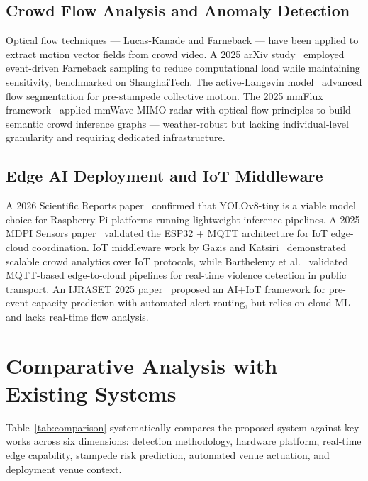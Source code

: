 \documentclass[12pt,a4paper]{article}
\begin{document}
\subsection{Crowd Flow Analysis and Anomaly Detection}

Optical flow techniques — Lucas-Kanade and Farneback — have been applied to extract motion vector fields from crowd video. A 2025 arXiv study~\cite{farneback_2025} employed event-driven Farneback sampling to reduce computational load while maintaining sensitivity, benchmarked on ShanghaiTech. The active-Langevin model~\cite{langevin} advanced flow segmentation for pre-stampede collective motion. The 2025 mmFlux framework~\cite{mmflux} applied mmWave MIMO radar with optical flow principles to build semantic crowd inference graphs — weather-robust but lacking individual-level granularity and requiring dedicated infrastructure.

\subsection{Edge AI Deployment and IoT Middleware}

A 2026 Scientific Reports paper~\cite{yolov8_edge_2026} confirmed that YOLOv8-tiny is a viable model choice for Raspberry Pi platforms running lightweight inference pipelines. A 2025 MDPI Sensors paper~\cite{esp32_mqtt} validated the ESP32 + MQTT architecture for IoT edge-cloud coordination. IoT middleware work by Gazis and Katsiri~\cite{iot_middleware} demonstrated scalable crowd analytics over IoT protocols, while Barthelemy et al.~\cite{barthelemy_2024} validated MQTT-based edge-to-cloud pipelines for real-time violence detection in public transport. An IJRASET 2025 paper~\cite{ijraset_2025} proposed an AI+IoT framework for pre-event capacity prediction with automated alert routing, but relies on cloud ML and lacks real-time flow analysis.

\section{Comparative Analysis with Existing Systems}

Table~\ref{tab:comparison} systematically compares the proposed system against key works across six dimensions: detection methodology, hardware platform, real-time edge capability, stampede risk prediction, automated venue actuation, and deployment venue context.
\end{document}
